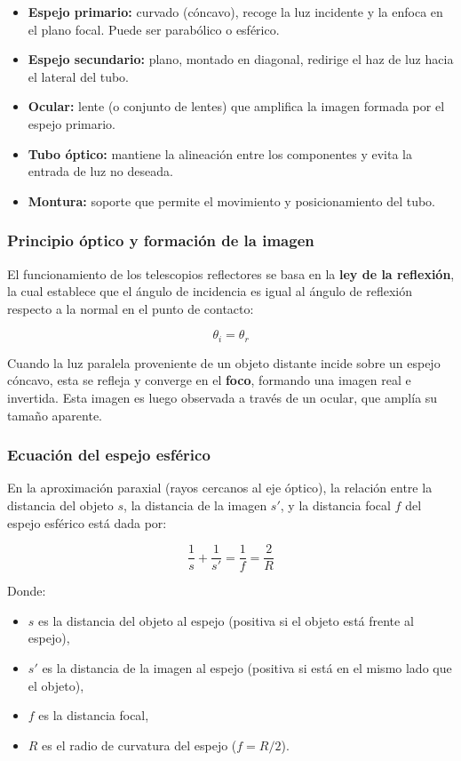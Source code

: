 \begin{itemize}
	\item \textbf{Espejo primario:} curvado (cóncavo), recoge la luz incidente y la enfoca en el plano focal. Puede ser parabólico o esférico.
	\item \textbf{Espejo secundario:} plano, montado en diagonal, redirige el haz de luz hacia el lateral del tubo.
	\item \textbf{Ocular:} lente (o conjunto de lentes) que amplifica la imagen formada por el espejo primario.
	\item \textbf{Tubo óptico:} mantiene la alineación entre los componentes y evita la entrada de luz no deseada.
	\item \textbf{Montura:} soporte que permite el movimiento y posicionamiento del tubo.
\end{itemize}

\subsubsection*{Principio óptico y formación de la imagen}

El funcionamiento de los telescopios reflectores se basa en la \textbf{ley de la reflexión}, la cual establece que el ángulo de incidencia es igual al ángulo de reflexión respecto a la normal en el punto de contacto:

\[
\theta_i = \theta_r
\]

Cuando la luz paralela proveniente de un objeto distante incide sobre un espejo cóncavo, esta se refleja y converge en el \textbf{foco}, formando una imagen real e invertida. Esta imagen es luego observada a través de un ocular, que amplía su tamaño aparente.

\subsubsection*{Ecuación del espejo esférico}

En la aproximación paraxial (rayos cercanos al eje óptico), la relación entre la distancia del objeto $s$, la distancia de la imagen $s'$, y la distancia focal $f$ del espejo esférico está dada por:

\begin{equation}
	\frac{1}{s} + \frac{1}{s'} = \frac{1}{f} = \frac{2}{R}
	\label{eq:espejo_esferico}
\end{equation}

Donde:
\begin{itemize}
	\item $s$ es la distancia del objeto al espejo (positiva si el objeto está frente al espejo),
	\item $s'$ es la distancia de la imagen al espejo (positiva si está en el mismo lado que el objeto),
	\item $f$ es la distancia focal,
	\item $R$ es el radio de curvatura del espejo ($f = R/2$).
\end{itemize}


